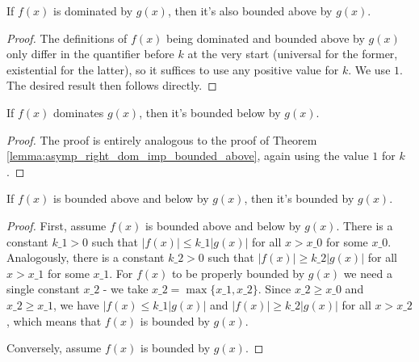 \begin{lemma}
    \label{lemma:asymp_right_dom_imp_bounded_above}
    \leanok
    If $f(x)$ is dominated by $g(x)$, then it's also bounded above by $g(x)$.
\end{lemma}

\begin{proof}
    \leanok 
    The definitions of $f(x)$ being dominated and bounded above by $g(x)$ only differ
    in the quantifier before $k$ at the very start (universal for the former, existential
    for the latter), so it suffices to use any positive value for $k$. We use $1$. 
    The desired result then follows directly.
\end{proof}

\begin{lemma}
    \label{lemma:asymp_left_dom_imp_bounded_below}
    \leanok
    If $f(x)$ dominates $g(x)$, then it's bounded below by $g(x)$.
\end{lemma}

\begin{proof}
    \leanok
    The proof is entirely analogous to the proof of Theorem 
    \ref{lemma:asymp_right_dom_imp_bounded_above}, again using the value 
    $1$ for $k$.
\end{proof}

\begin{theorem}
    \label{thm:asymp_bounded_above_below_iff}
    \leanok
    If $f(x)$ is bounded above and below by $g(x)$, then it's bounded by $g(x)$.
\end{theorem}

\begin{proof}
    \leanok
    First, assume $f(x)$ is bounded above and below by $g(x)$. There is a constant
    $k\_1 > 0$ such that $|f(x)| \le k\_1 |g(x)|$ for all $x > x\_0$ for some $x\_0$.
    Analogously, there is a constant $k\_2 > 0$ such that $|f(x)| \ge k\_2 |g(x)|$ 
    for all $x > x\_1$ for some $x\_1$. For $f(x)$ to be properly bounded by $g(x)$ 
    we need a single constant $x\_2$ - we take $x\_2 = \max{\{x\_1, x\_2\}}$. Since 
    $x\_2 \ge x\_0$ and $x\_2 \ge x\_1$, we have $|f(x) \le k\_1 |g(x)|$ and 
    $|f(x)| \ge k\_2 |g(x)|$ for all $x > x\_2$, which means that $f(x)$ is bounded
    by $g(x)$.

    Conversely, assume $f(x)$ is bounded by $g(x)$.
\end{proof}


